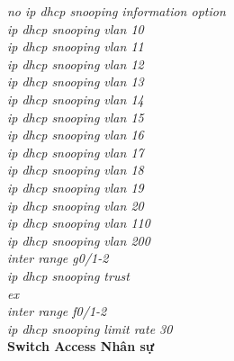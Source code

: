 \documentclass[a4paper, 12pt]{article}
\begin{document}
\hspace*{2cm}\textit{no ip dhcp snooping information option\\
\hspace*{2cm}ip dhcp snooping vlan 10\\
\hspace*{2cm}ip dhcp snooping vlan 11\\
\hspace*{2cm}ip dhcp snooping vlan 12\\
\hspace*{2cm}ip dhcp snooping vlan 13\\
\hspace*{2cm}ip dhcp snooping vlan 14\\
\hspace*{2cm}ip dhcp snooping vlan 15\\
\hspace*{2cm}ip dhcp snooping vlan 16\\
\hspace*{2cm}ip dhcp snooping vlan 17\\
\hspace*{2cm}ip dhcp snooping vlan 18\\
\hspace*{2cm}ip dhcp snooping vlan 19\\
\hspace*{2cm}ip dhcp snooping vlan 20\\
\hspace*{2cm}ip dhcp snooping vlan 110\\
\hspace*{2cm}ip dhcp snooping vlan 200\\
\hspace*{2cm}inter range g0/1-2\\
\hspace*{2cm}ip dhcp snooping trust\\
\hspace*{2cm}ex\\
\hspace*{2cm}inter range f0/1-2\\
\hspace*{2cm}ip dhcp snooping limit rate 30\\}
\hspace*{1cm}\textbf{Switch Access Nhân sự}\\
\end{document}
